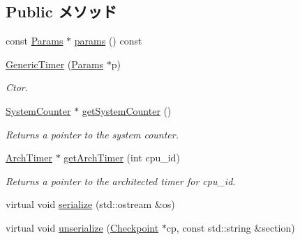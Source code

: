 \subsection*{Public メソッド}
\begin{DoxyCompactItemize}
\item 
const \hyperlink{classGenericTimer_a22b88e736eb537a678104e1f9d03b967}{Params} $\ast$ \hyperlink{classGenericTimer_acd3c3feb78ae7a8f88fe0f110a718dff}{params} () const 
\item 
\hyperlink{classGenericTimer_ab181001a27fc011ac7f4cf037355fe52}{GenericTimer} (\hyperlink{classGenericTimer_a22b88e736eb537a678104e1f9d03b967}{Params} $\ast$p)
\begin{DoxyCompactList}\small\item\em Ctor. \item\end{DoxyCompactList}\item 
\hyperlink{classGenericTimer_1_1SystemCounter}{SystemCounter} $\ast$ \hyperlink{classGenericTimer_aa2f9dd95a2e3e767b4f84eb8f3fe1b3c}{getSystemCounter} ()
\begin{DoxyCompactList}\small\item\em Returns a pointer to the system counter. \item\end{DoxyCompactList}\item 
\hyperlink{classGenericTimer_1_1ArchTimer}{ArchTimer} $\ast$ \hyperlink{classGenericTimer_a29c0ab5dcf6b80bda0bcab1529bbdb12}{getArchTimer} (int cpu\_\-id)
\begin{DoxyCompactList}\small\item\em Returns a pointer to the architected timer for cpu\_\-id. \item\end{DoxyCompactList}\item 
virtual void \hyperlink{classGenericTimer_a53e036786d17361be4c7320d39c99b84}{serialize} (std::ostream \&os)
\item 
virtual void \hyperlink{classGenericTimer_af22e5d6d660b97db37003ac61ac4ee49}{unserialize} (\hyperlink{classCheckpoint}{Checkpoint} $\ast$cp, const std::string \&section)
\end{DoxyCompactItemize}
